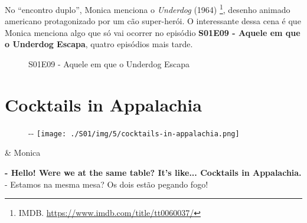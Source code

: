 No ``encontro duplo'', Monica menciona o \emph{Underdog} (1964)
\footnote{\sloppy IMDB. \url{https://www.imdb.com/title/tt0060037/}},
desenho animado americano protagonizado por um cão super-herói. O
interessante dessa cena é que Monica menciona algo que só vai ocorrer no
episódio
\textbf{\textcolor{primarycolor}{S01E09 - Aquele em que o Underdog Escapa}},
quatro episódios mais tarde.

\begin{figure}
  \centering
    \caption{S01E09 - Aquele em que o Underdog Escapa\label{fig:s01-e09-aquele-em-que-o-underdog-escapa}}
\end{figure}

\hypertarget{cocktails-in-appalachia}{%
\section{Cocktails in Appalachia}\label{cocktails-in-appalachia}}

\begin{figure}[!ht]
  \begin{adjustwidth}{-\oddsidemargin-1in}{-\rightmargin}
    \centering
    \texttt{[image: ./S01/img/5/cocktails-in-appalachia.png]}
  \end{adjustwidth}
\end{figure}

\begin{tcolorbox}[enhanced,center upper,
    drop fuzzy shadow southeast, boxrule=0.3pt,
    lower separated=false, breakable,
    colframe=black!30!dialogoBorder,colback=white]
\begin{minipage}[c]{0.16\linewidth}
   & \centering \scriptsize{Monica}
\end{minipage}
\hfill
\begin{minipage}[c]{0.8\linewidth}
  \textbf{- Hello! Were we at the same table? It's like... Cocktails in Appalachia.}\\
  - Estamos na mesma mesa? Os dois estão pegando fogo!
\end{minipage}
\end{tcolorbox}

